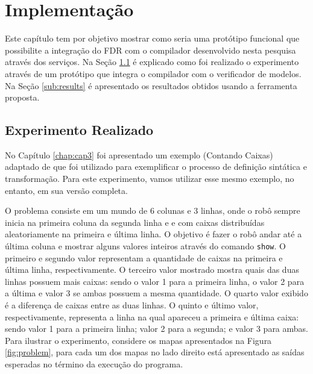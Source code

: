 \chapter{Implementação} %
\label{chap:cap4}
Este capítulo tem por objetivo mostrar como seria uma protótipo funcional que possibilite a integração do FDR com o compilador desenvolvido nesta pesquisa através dos serviços. Na Seção \ref{sub:exper} é explicado como foi realizado o experimento através de um protótipo que integra o compilador com o verificador de modelos. Na Seção \ref{sub:results} é apresentado os resultados obtidos usando a ferramenta proposta.

\section{Experimento Realizado}
\label{sub:exper}

No Capítulo \ref{chap:cap3} foi apresentado um exemplo (Contando Caixas) adaptado de \cite{furb} que foi utilizado para exemplificar o processo de definição sintática e transformação. Para este experimento, vamos utilizar esse mesmo exemplo, no entanto, em sua versão completa.

\label{sec:defprob}
O problema consiste em um mundo de 6 colunas e 3 linhas, onde o robô sempre inicia na primeira coluna da segunda linha e e com caixas distribuídas aleatoriamente na primeira e última linha. O objetivo é fazer o robô andar até a última coluna e mostrar alguns valores inteiros através do comando \texttt{show}. O primeiro e segundo valor representam a quantidade de caixas na primeira e última linha, respectivamente. O terceiro valor mostrado mostra quais das duas linhas possuem mais caixas: sendo o valor 1 para a primeira linha, o valor 2 para a última e valor 3 se ambas possuem a mesma quantidade. O quarto valor exibido é a diferença de caixas entre as duas linhas. O quinto e último valor, respectivamente, representa a linha na qual apareceu a primeira e última caixa: sendo valor 1 para a primeira linha; valor 2 para a segunda; e valor 3 para ambas. Para ilustrar o experimento, considere os mapas apresentados na Figura \ref{fig:problem}, para cada um dos mapas no lado direito está apresentado as saídas esperadas no término da execução do programa.

